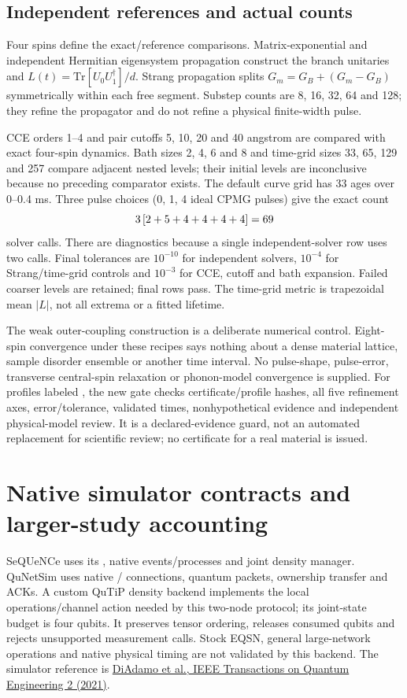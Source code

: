 \subsection{Independent references and actual counts}
Four spins define the exact/reference comparisons. Matrix-exponential and independent Hermitian eigensystem propagation construct the branch unitaries and $L(t)=\mathrm{Tr}[U_0U_1^\dagger]/d$. Strang propagation splits $G_m=G_B+(G_m-G_B)$ symmetrically within each free segment. Substep counts are 8, 16, 32, 64 and 128; they refine the propagator and do not refine a physical finite-width pulse.

CCE orders 1--4 and pair cutoffs 5, 10, 20 and 40 angstrom are compared with exact four-spin dynamics. Bath sizes 2, 4, 6 and 8 and time-grid sizes 33, 65, 129 and 257 compare adjacent nested levels; their initial levels are inconclusive because no preceding comparator exists. The default curve grid has 33 ages over 0--0.4 ms. Three pulse choices (0, 1, 4 ideal CPMG pulses) give the exact count
\[
3\,[2+5+4+4+4+4]=69{}
\]
solver calls. There are \ConvRows{} diagnostics because a single independent-solver row uses two calls. Final tolerances are $10^{-10}$ for independent solvers, $10^{-4}$ for Strang/time-grid controls and $10^{-3}$ for CCE, cutoff and bath expansion. Failed coarser levels are retained; final rows pass. The time-grid metric is trapezoidal mean $|L|$, not all extrema or a fitted lifetime.

The weak outer-coupling construction is a deliberate numerical control. Eight-spin convergence under these recipes says nothing about a dense material lattice, sample disorder ensemble or another time interval. No pulse-shape, pulse-error, transverse central-spin relaxation or phonon-model convergence is supplied. For profiles labeled , the new gate checks certificate/profile hashes, all five refinement axes, error/tolerance, validated times, nonhypothetical evidence and independent physical-model review. It is a declared-evidence guard, not an automated replacement for scientific review; no certificate for a real material is issued.

\section{Native simulator contracts and larger-study accounting}
SeQUeNCe uses its , native events/processes and joint density manager. QuNetSim uses native / connections, quantum packets, ownership transfer and ACKs. A custom QuTiP density backend implements the local operations/channel action needed by this two-node protocol; its joint-state budget is four qubits. It preserves tensor ordering, releases consumed qubits and rejects unsupported measurement calls. Stock EQSN, general large-network operations and native physical timing are not validated by this backend. The simulator reference is \href{https://doi.org/10.1109/TQE.2021.3092395}{DiAdamo et al., IEEE Transactions on Quantum Engineering 2 (2021)}.

